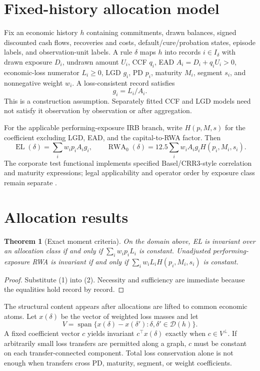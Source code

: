 \documentclass[a4paper,10pt]{article}
\newtheorem{theorem}{Theorem}
\begin{document}
\section{Fixed-history allocation model}

Fix an economic history $h$ containing commitments, drawn balances, signed discounted cash flows, recoveries and costs, default/cure/probation states, episode labels, and observation-unit labels. A rule $\delta$ maps $h$ into records $i\in I_\delta$ with drawn exposure $D_i$, undrawn amount $U_i$, CCF $q_i$, EAD $A_i=D_i+q_iU_i>0$, economic-loss numerator $L_i\ge0$, LGD $g_i$, PD $p_i$, maturity $M_i$, segment $s_i$, and nonnegative weight $w_i$. A loss-consistent record satisfies
\[
g_i=L_i/A_i. \tag{1}
\]
This is a construction assumption. Separately fitted CCF and LGD models need not satisfy it observation by observation or after aggregation.

For the applicable performing-exposure IRB branch, write $H(p,M,s)$ for the coefficient excluding LGD, EAD, and the capital-to-RWA factor. Then
\[
\operatorname{EL}(\delta)=\sum_i w_ip_iA_ig_i,
\qquad
\operatorname{RWA}_0(\delta)=12.5\sum_iw_iA_ig_iH(p_i,M_i,s_i). \tag{2}
\]
The corporate test functional implements specified Basel/CRR3-style correlation and maturity expressions; legal applicability and operator order by exposure class remain separate \cite{baselcre31,crrconsolidated}.

\section{Allocation results}

\begin{theorem}[Exact moment criteria]
On the domain above, EL is invariant over an allocation class if and only if $\sum_iw_ip_iL_i$ is constant. Unadjusted performing-exposure RWA is invariant if and only if $\sum_iw_iL_iH(p_i,M_i,s_i)$ is constant.
\end{theorem}

\begin{proof}
Substitute (1) into (2). Necessity and sufficiency are immediate because the equalities hold record by record.
\end{proof}

The structural content appears after allocations are lifted to common economic atoms. Let $x(\delta)$ be the vector of weighted loss masses and let
\[
V=\operatorname{span}\{x(\delta)-x(\delta'): \delta,\delta'\in\mathcal D(h)\}.
\]
A fixed coefficient vector $c$ yields invariant $c^\top x(\delta)$ exactly when $c\in V^\perp$. If arbitrarily small loss transfers are permitted along a graph, $c$ must be constant on each transfer-connected component. Total loss conservation alone is not enough when transfers cross PD, maturity, segment, or weight coefficients.
\end{document}
